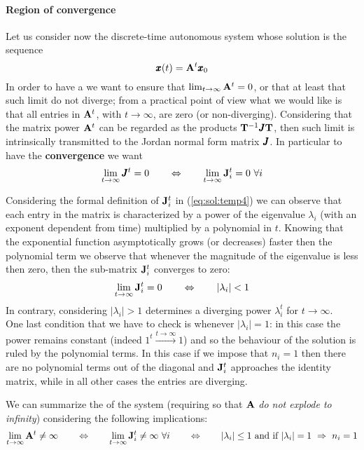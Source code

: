 	\paragraph{Region of convergence} Let us consider now the discrete-time autonomous system whose solution is the sequence
	\[ \pmb{x}(t) = \mathbf{A}^t \pmb{x}_0 \]
	In order to have a  we want to ensure that $\lim_{t\rightarrow\infty} \mathbf{A}^t = 0$, or that at least that such limit do not diverge; from a practical point of view what we would like is that all entries in $\mathbf{A}^t$, with $t\rightarrow\infty$, are zero (or non-diverging). Considering that the matrix power $\mathbf{A}^t$ can be regarded as the products $\mathbf{T}^{-1} \pmb{J} \mathbf{T}$, then such limit is intrinsically transmitted to the Jordan normal form matrix $\pmb{J}$. In particular to have the \textbf{convergence} we want
	\[ \lim_{t\rightarrow\infty} \jordan^t = 0 \qquad \Leftrightarrow \qquad \lim_{t\rightarrow\infty} \mat J_i^t = 0 \ \forall i \]
	
	Considering the formal definition of $\mathbf{J}_i^t$ in (\ref{eq:sol:temp4}) we can observe that each entry in the matrix is characterized by a power of the eigenvalue $\lambda_i$ (with an exponent dependent from time) multiplied by a polynomial in $t$. Knowing that the exponential function asymptotically grows (or decreases) faster then the polynomial term we observe that whenever the magnitude of the eigenvalue is less then zero, then the sub-matrix $\mathbf{J}_i^t$ converges to zero:
	\begin{equation}
		\lim_{t\rightarrow\infty} \mathbf{J}_i^t = 0 \qquad \Leftrightarrow \qquad |\lambda_i| < 1
	\end{equation}
	In contrary, considering $|\lambda_i| > 1$ determines a diverging power $\lambda_i^t$ for $t\rightarrow \infty$.\\
	One last condition that we have to check is whenever $|\lambda_i| = 1$: in this case the power remains constant (indeed $1^t \xrightarrow{t\rightarrow \infty} 1$) and so the behaviour of the solution is ruled by the polynomial terms. In this case if we impose that $n_i = 1$ then there are no polynomial terms out of the diagonal and $\mathbf{J}_i^t$ approaches the identity matrix, while in all other cases the entries are diverging.
	
	We can summarize the  of the system (requiring so that $\mathbf{A}$ \textit{do not explode to infinity}) considering the following implications:
	\begin{equation}
		\lim_{t\rightarrow\infty} \mathbf{A}^t \neq \infty \qquad \Leftrightarrow \qquad \lim_{t\rightarrow\infty} \mathbf{J}_i^t \neq \infty \ \forall i \qquad \Leftrightarrow \qquad |\lambda_i| \leq 1 \textrm{ and if } |\lambda_i|=1 \ \Rightarrow \ n_i = 1
	\end{equation}
	
